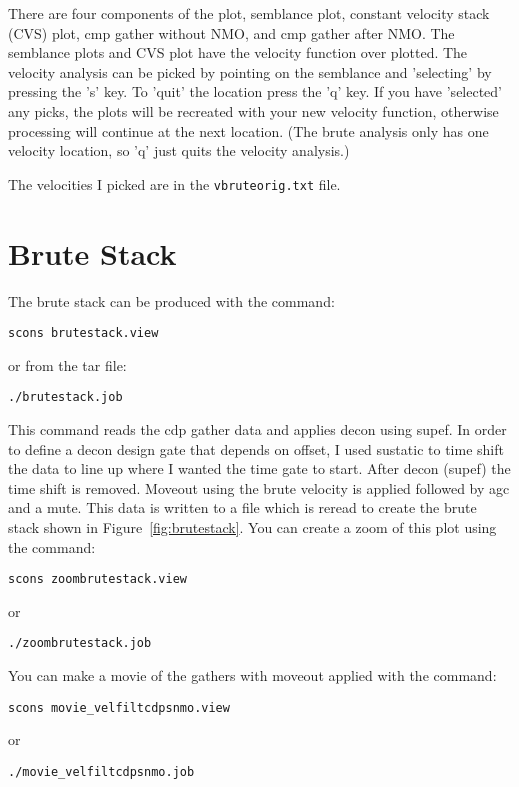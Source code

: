 There are four components of the plot, semblance plot, constant velocity 
stack (CVS) plot, cmp gather without NMO, and cmp gather after NMO.  The 
semblance plots and CVS plot have the velocity function over plotted.  
The velocity analysis can be picked by pointing on the semblance and 
'selecting' by pressing the 's' key.  To 'quit' the location press the 
'q' key.  If you have 'selected' any picks, the plots will be recreated 
with your new velocity function, otherwise processing will continue at 
the next location.  (The brute analysis only has one velocity location, 
so 'q' just quits the velocity analysis.)

The velocities I picked are in the \texttt{vbruteorig.txt} file.


\section{Brute Stack}
The brute stack can be produced with the command: 
\begin{verbatim}
scons brutestack.view
\end{verbatim}
or from the tar file:
\begin{verbatim}
./brutestack.job
\end{verbatim}

This command reads the cdp gather data and applies decon using supef.  In 
order to define a decon design gate that depends on offset, I used sustatic 
to time shift the data to line up where I wanted the time gate to start.  
After decon (supef) the time shift is removed.  Moveout using the brute 
velocity is applied followed by agc and a mute.  This data is written to a 
file which is reread to create the brute stack shown in 
Figure~\ref{fig:brutestack}.  You can create a zoom of this plot using the 
command:
\begin{verbatim}
scons zoombrutestack.view
\end{verbatim}
or
\begin{verbatim}
./zoombrutestack.job
\end{verbatim}

You can make a movie of the gathers with moveout applied with the
command: 
\begin{verbatim}
scons movie_velfiltcdpsnmo.view
\end{verbatim}
or
\begin{verbatim}
./movie_velfiltcdpsnmo.job
\end{verbatim}

